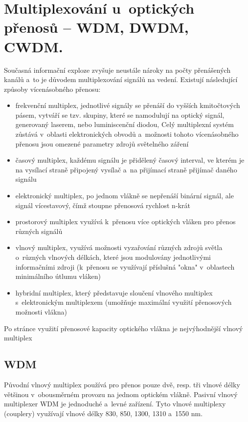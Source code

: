 \section{Multiplexování u~optických přenosů – WDM, DWDM, CWDM.}
Současná informační exploze zvyšuje neustále nároky na počty přenášených kanálů a~to je důvodem multiplexování signálů na vedení. Existují následující způsoby vícenásobného přenosu:
\begin{itemize}
  \item frekvenční multiplex, jednotlivé signály se přenáší do vyšších kmitočtových pásem, vytváří se tzv. skupiny, které se namodulují na optický signál, generovaný laserem, nebo luminiscenční diodou, Celý multiplexní systém zůstává v~oblasti elektronických obvodů a~možnosti tohoto vícenásobného přenosu jsou omezené parametry zdrojů světelného záření
  \item časový multiplex, každému signálu je přidělený časový interval, ve kterém je na vysílací straně připojený vysílač a~na přijímací straně přijímač daného signálu
  \item elektronický multiplex, po jednom vlákně se nepřenáší binární signál, ale signál vícestavový, čímž stoupne přenosová rychlost n-krát
  \item prostorový multiplex využívá k~přenosu více optických vláken pro přenos různých signálů
  \item vlnový multiplex, využívá možnosti vyzařování různých zdrojů světla o~různých vlnových délkách, které jsou modulovány jednotlivými informačními zdroji (k~přenosu se využívají příslušná "okna" v~oblastech minimálního útlumu vláken)
  \item hybridní multiplex, který představuje sloučení vlnového multiplex s~elektronickým multiplexem (umožňuje maximální využití přenosových možnosti vlákna)
\end{itemize}
Po stránce využití přenosové kapacity optického vlákna je
nejvýhodnější vlnový multiplex

\subsection{WDM}
Původní vlnový multiplex používá pro přenos pouze dvě, resp. tři vlnové délky většinou v~obousměrném provozu na jednom optickém vlákně. Pasivní vlnový multiplexer WDM je jednoduché a~levné zařízení. Tyto vlnové multiplexy (couplery) využívají vlnové délky 830, 850, 1300, 1310 a~1550 nm.

